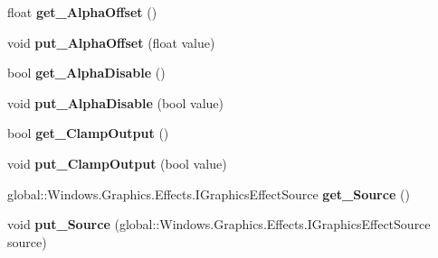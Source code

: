 \begin{DoxyCompactItemize}
float {\bfseries get\+\_\+\+Alpha\+Offset} ()
\item 
\mbox{\label{class_microsoft_1_1_graphics_1_1_canvas_1_1_effects_1_1_gamma_transfer_effect_ae92a33578f4b1e8c7ef44afc2dd914b2}} 
void {\bfseries put\+\_\+\+Alpha\+Offset} (float value)
\item 
\mbox{\label{class_microsoft_1_1_graphics_1_1_canvas_1_1_effects_1_1_gamma_transfer_effect_ac99e552d17e439e01b9d30bd336d3cad}} 
bool {\bfseries get\+\_\+\+Alpha\+Disable} ()
\item 
\mbox{\label{class_microsoft_1_1_graphics_1_1_canvas_1_1_effects_1_1_gamma_transfer_effect_ae37bb6d2650bbe21081907b456fdaa91}} 
void {\bfseries put\+\_\+\+Alpha\+Disable} (bool value)
\item 
\mbox{\label{class_microsoft_1_1_graphics_1_1_canvas_1_1_effects_1_1_gamma_transfer_effect_a5a4f8fba325b4ab2ea79efe633af07c5}} 
bool {\bfseries get\+\_\+\+Clamp\+Output} ()
\item 
\mbox{\label{class_microsoft_1_1_graphics_1_1_canvas_1_1_effects_1_1_gamma_transfer_effect_aa0ea4517855831f3f871ce91779f071c}} 
void {\bfseries put\+\_\+\+Clamp\+Output} (bool value)
\item 
\mbox{\label{class_microsoft_1_1_graphics_1_1_canvas_1_1_effects_1_1_gamma_transfer_effect_a0a4fdf6b62a6e86407013ef990cbada3}} 
global\+::\+Windows.\+Graphics.\+Effects.\+I\+Graphics\+Effect\+Source {\bfseries get\+\_\+\+Source} ()
\item 
\mbox{\label{class_microsoft_1_1_graphics_1_1_canvas_1_1_effects_1_1_gamma_transfer_effect_aaf20d39a766d74d330782a240df170de}} 
void {\bfseries put\+\_\+\+Source} (global\+::\+Windows.\+Graphics.\+Effects.\+I\+Graphics\+Effect\+Source source)

\end{DoxyCompactItemize}
